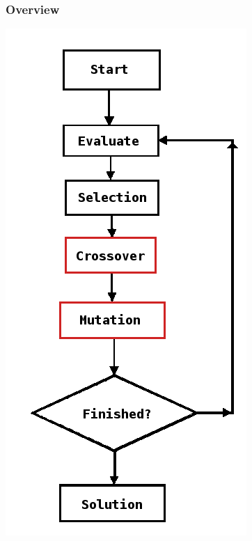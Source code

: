 \documentclass{beamer}
\begin{document}
\begin{frame}
\frametitle{Overview}
\begin{center}
\includegraphics[scale=0.25]{ga}

\end{center}
\end{frame}
\end{document}
